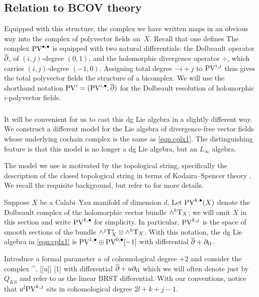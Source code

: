 \documentclass[11pt]{amsart}
\begin{document}
\subsection{Relation to BCOV theory}

\parsec[sec:pv] 
Equipped with this structure, the complex we have written maps in an obvious way into the complex of polyvector fields on~$X$. Recall that one defines
The complex ${\rm PV}^{\bullet,\bullet}$ is equipped with two natural differentials: the Dolbeault operator $\overline{\partial}$, of $(i,j)$-degree $(0,1)$, and the holomorphic divergence operator $\div$, which carries $(i,j)$-degree $(-1,0)$. Assigning total degree $- i + j$ to ${\rm PV}^{i,j}$ thus gives the total polyvector fields the structure of a bicomplex. We will use the shorthand notation ${\rm PV}^i = ({\rm PV}^{i,\bullet}, \overline{\partial} )$ for the Dolbeault resolution of holomorphic $i$-polyvector fields. 

\subsubsection{}
It will be convenient for us to cast this dg Lie algebra in a slightly different way.
We construct a different model for the Lie algebra of divergence-free vector fields whose underlying cochain complex is the same as \eqref{eqn:cplx1}. 
The distinguishing feature is that this model is no longer a dg Lie algebra, but an $L_\infty$ algebra. 

The model we use is motivated by the topological string, specifically the description of the closed topological string in terms of Kodaira--Spencer theory \cite{BCOV}.
We recall the requisite background, but refer to \cite{CLbcov1,CLbcov2,CLtypeI} for more details. 

Suppose $X$ be a Calabi--Yau manifold of dimension $d$. 
Let ${\rm PV}^{k,\bullet}(X)$ denote the Dolbeault complex of the holomorphic vector bundle $\wedge^k {\rm T}_X$; we will omit $X$ in this section and write ${\rm PV}^{k,\bullet}$ for simplicity.
In particular, ${\rm PV}^{k,j}$ is the space of smooth sections of the bundle $\wedge^j {\rm T}_X^* \otimes \wedge^k {\rm T}_X$. 
With this notation, the dg Lie algebra in \eqref{eqn:cplx1} is ${\rm PV}^{1,\bullet} \oplus {\rm PV}^{0,\bullet}[-1]$ with differential $\overline{\partial} + \partial_{\Omega}$. 

Introduce a formal parameter $u$ of cohomological degree $+2$ and consider the complex 
\beqn\label{eqn:pv1}
\PV^{\bu,\bu} [[u]] [1]
\eeqn
with differential $\overline{\partial} + u \partial_{\Omega}$ which we will often denote just by $Q_{KS}$ and refer to as the linear BRST differential. 
With our conventions, notice that $u^l {\rm PV}^{k,j}$ sits in cohomological degree $2l +k + j - 1$. 
\end{document}
